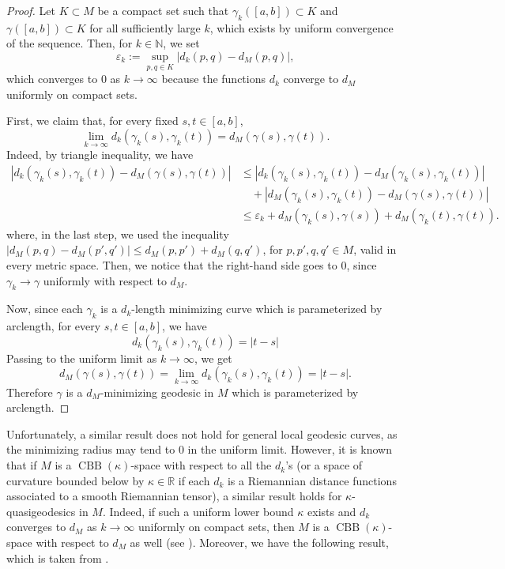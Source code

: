 \documentclass[11pt]{article}
\theoremstyle{definition}
\theoremstyle{remark}
\theoremstyle{plain}
\DeclareMathOperator{\CBB}{CBB}
\newcommand{\R}{\mathbb{R}}
\newcommand{\N}{\mathbb{N}}
\begin{document}
\begin{proof}
Let $K\subset M$ be a compact set such that $\gamma_k([a,b])\subset K$ and $\gamma([a,b])\subset K$ for all sufficiently large $k$, which exists by uniform convergence of the sequence. Then, for $k\in \N$, we set
$$\varepsilon_k:=\sup_{p,q\in K}|d_k(p,q)-d_M(p,q)|,$$
which converges to $0$ as $k\to\infty$ because the functions $d_k$ converge to $d_M$ uniformly on compact sets.

First, we claim that, for every fixed $s,t\in[a,b]$,
$$\lim_{k\to\infty}d_k(\gamma_k(s),\gamma_k(t))= d_M(\gamma(s),\gamma(t)).$$
Indeed, by triangle inequality, we have
\begin{equation*}
\begin{split}
\left|d_k(\gamma_k(s),\gamma_k(t))-d_M(\gamma(s),\gamma(t))\right| & \le\left|d_k(\gamma_k(s),\gamma_k(t))- d_M(\gamma_k(s),\gamma_k(t))\right| \\
& \quad+\left|d_M(\gamma_k(s),\gamma_k(t)) -d_M(\gamma(s),\gamma(t))\right|\\
& \le\varepsilon_k+d_M(\gamma_k(s),\gamma(s)) + d_M(\gamma_k(t),\gamma(t)).
\end{split}
\end{equation*}
where, in the last step, we used the inequality $|d_M(p,q)-d_M(p',q')|\le d_M(p,p') + d_M(q,q')$, for $p,p',q,q'\in M$, valid in every metric space. Then, we notice that the right-hand side goes to $0$, since $\gamma_k\to\gamma$ uniformly with respect to $d_M$.

Now, since each $\gamma_k$ is a $d_k$-length minimizing curve which is parameterized by arclength, for every $s,t\in[a,b]$, we have
$$ d_k(\gamma_k(s),\gamma_k(t)) =|t-s|$$
Passing to the uniform limit as $k\to\infty$, we get
$$d_M(\gamma(s),\gamma(t))= \lim_{k\to\infty}d_k(\gamma_k(s),\gamma_k(t)) = |t-s|.$$
Therefore $\gamma$ is a $d_M$-minimizing geodesic in $M$ which is parameterized by arclength.
\end{proof}


Unfortunately, a similar result does not hold for general local geodesic curves, as the minimizing radius may tend to $0$ in the uniform limit. However, it is known that if $M$ is a $\CBB(\kappa)$-space with respect to all the $d_k$'s (or a space of curvature bounded below by $\kappa\in \R$ if each $d_k$ is a Riemannian distance functions associated to a smooth Riemannian tensor), a similar result holds for $\kappa$-quasigeodesics in $M$. Indeed, if such a uniform lower bound $\kappa$ exists and $d_k$ converges to $d_M$ as $k\to \infty$ uniformly on compact sets, then $M$ is a $\CBB(\kappa)$-space with respect to $d_M$ as well (see \cite[Proposition 10.7.1]{Course}). Moreover, we have the following result, which is taken from \cite{PetruninSemiconcave}.
\end{document}
